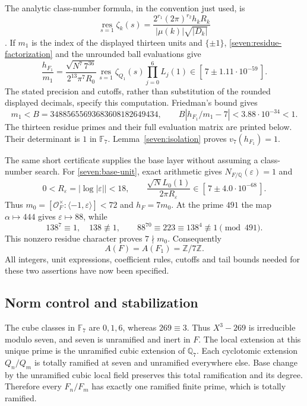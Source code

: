 The analytic class-number formula, in the convention just used, is
\[
 \operatorname*{res}_{s=1}\zeta_k(s)
  =\frac{2^{r_1}(2\pi)^{r_2}h_kR_k}
         {|\mu(k)|\sqrt{|D_k|}}
 \tag{S23}\label{seven:class-formula}
\]
\cite[Theorem~18.13]{sevenSutherland2015}.
If $m_1$ is the index of the displayed thirteen units and $\{\pm1\}$,
\eqref{seven:residue-factorization} and the unrounded ball evaluations give
\[
 \frac{h_{F_1}}{m_1}
 =\frac{\sqrt{N^7\,7^{36}}}
        {2^{13}\pi^7R_0}
   \operatorname*{res}_{s=1}\zeta_{Q_1}(s)\prod_{j=0}^6L_j(1)
 \in[\,7\pm1.11\cdot10^{-59}\,].
 \tag{S24}\label{seven:quotient-interval}
\]
The stated precision and cutoffs, rather than substitution of the rounded
displayed decimals, specify this computation.
Friedman's bound gives
\[
 m_1<B=34885655693683608182649434,
 \qquad
 B\left|h_{F_1}/m_1-7\right|<3.88\cdot10^{-34}<1.
 \tag{S25}\label{seven:index-bound}
\]
The thirteen residue primes and their full evaluation matrix are printed
below. Their determinant is $1$ in $\mathbb F_7$.
Lemma~\ref{seven:isolation} proves $v_7(h_{F_1})=1$.

The same short certificate supplies the base layer without assuming a
class-number search. For \eqref{seven:base-unit}, exact arithmetic gives
$N_{F/\mathbb Q}(\varepsilon)=1$ and
\[
 0<R_\varepsilon=|\log|\varepsilon||<18,\qquad
 \frac{\sqrt N L_0(1)}{2\pi R_\varepsilon}
 \in[\,7\pm4.0\cdot10^{-68}\,].
 \tag{S26}\label{seven:base-quotient}
\]
Thus $m_0=[\mathcal O_F^\times:\langle-1,\varepsilon\rangle]<72$ and
$h_F=7m_0$.
At the prime $491$ the map $\alpha\mapsto444$ gives
$\varepsilon\mapsto88$, while
\[
 138^7\equiv1,\quad138\not\equiv1,\qquad
 88^{70}\equiv223\equiv138^4\not\equiv1\pmod{491}.
 \tag{S27}\label{seven:base-saturation}
\]
This nonzero residue character proves $7\nmid m_0$.
Consequently
\[
 A(F)=A(F_1)=\mathbb Z/7\mathbb Z.
 \tag{S28}\label{seven:finite-inputs}
\]
All integers, unit expressions, coefficient rules, cutoffs and tail bounds
needed for these two assertions have now been specified.

\subsection{Norm control and stabilization}
\label{seven:stability-proof}

The cube classes in $\mathbb F_7$ are $0,1,6$, whereas $269\equiv3$.
Thus $X^3-269$ is irreducible modulo seven, and seven is unramified and inert
in $F$. The local extension at this unique prime is the unramified cubic
extension of $\mathbb Q_7$.
Each cyclotomic extension $Q_n/Q_m$ is totally ramified at seven and
unramified everywhere else. Base change by the unramified cubic local
field preserves this total ramification and its degree. Therefore every
$F_n/F_m$ has exactly one ramified finite prime, which is totally ramified.

